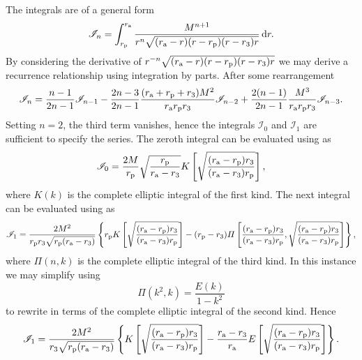 The integrals are of a general form
\begin{equation}
\mathscr{I}_n = \int_{r_\mathrm{p}}^{r_\mathrm{a}}{\frac{M^{n+1}}{r^n\sqrt{(r_\mathrm{a} - r)(r - r_\mathrm{p})(r - r_3)r}}}\,\mathrm{d}{r}.
\end{equation}
By considering the derivative of $r^{-n}\sqrt{(r_\mathrm{a} - r)(r - r_\mathrm{p})(r - r_3)r}$ we may derive a recurrence relationship using integration by parts. After some rearrangement
\begin{equation}
\mathscr{I}_n = \frac{n - 1}{2n - 1}\mathscr{I}_{n-1} - \frac{2n - 3}{2n - 1} \frac{(r_\mathrm{a} + r_\mathrm{p} + r_3)M^2}{r_\mathrm{a}r_\mathrm{p}r_3}\mathscr{I}_{n-2} + \frac{2(n - 1)}{2n-1}\frac{M^3}{r_\mathrm{a}r_\mathrm{p}r_3}\mathscr{I}_{n-3}.
\end{equation}
Setting $n = 2$, the third term vanishes, hence the integrals $\mathscr{I}_0$ and $\mathscr{I}_1$ are sufficient to specify the series. The zeroth integral can be evaluated using \citet[3.147.6]{Gradshteyn2000} as
\begin{equation}
\mathscr{I}_0 = \frac{2M}{r_\mathrm{p}}\sqrt{\frac{r_\mathrm{p}}{r_\mathrm{a} - r_3}}K\left[\sqrt{\frac{(r_\mathrm{a} - r_\mathrm{p})r_3}{(r_\mathrm{a} - r_3)r_\mathrm{p}}}\right],
\end{equation}
where $K(k)$ is the complete elliptic integral of the first kind. The next integral can be evaluated using \citet[3.149.6]{Gradshteyn2000} as
\begin{equation}
\mathscr{I}_1 = \frac{2M^2}{r_\mathrm{p}r_3\sqrt{r_\mathrm{p}(r_\mathrm{a} - r_3)}}\left\{r_\mathrm{p}K\left[\sqrt{\frac{(r_\mathrm{a} - r_\mathrm{p})r_3}{(r_\mathrm{a} - r_3)r_\mathrm{p}}}\right] - (r_\mathrm{p} - r_3)\Pi\left[\frac{(r_\mathrm{a} - r_\mathrm{p})r_3}{(r_\mathrm{a} - r_3)r_\mathrm{p}}, \sqrt{\frac{(r_\mathrm{a} - r_\mathrm{p})r_3}{(r_\mathrm{a} - r_3)r_\mathrm{p}}}\right]\right\},
\end{equation}
where $\Pi(n,k)$ is the complete elliptic integral of the third kind. In this instance we may simplify using \citet[19.6.2]{Olver2010}
\begin{equation}
\Pi(k^2,k) = \frac{E(k)}{1 - k^2}
\end{equation}
to rewrite in terms of the complete elliptic integral of the second kind. Hence
\begin{equation}
\mathscr{I}_1 = \frac{2M^2}{r_3\sqrt{r_\mathrm{p}(r_\mathrm{a} - r_3)}}\left\{K\left[\sqrt{\frac{(r_\mathrm{a} - r_\mathrm{p})r_3}{(r_\mathrm{a} - r_3)r_\mathrm{p}}}\right] - \frac{r_\mathrm{a} - r_3}{r_\mathrm{a}}E\left[\sqrt{\frac{(r_\mathrm{a} - r_\mathrm{p})r_3}{(r_\mathrm{a} - r_3)r_\mathrm{p}}}\right]\right\}.
\end{equation}

